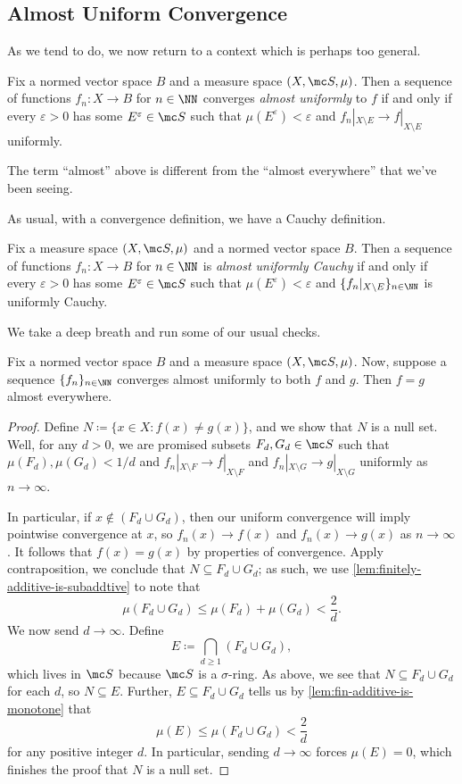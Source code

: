 \documentclass[../notes.tex]{subfiles}
\begin{document}
\subsection{Almost Uniform Convergence}
As we tend to do, we now return to a context which is perhaps too general.
\begin{definition}
	Fix a normed vector space $B$ and a measure space $(X,\mc S,\mu)$. Then a sequence of functions $f_n\colon X\to B$ for $n\in\NN$ converges \textit{almost uniformly} to $f$ if and only if every $\varepsilon>0$ has some $E^\varepsilon\in\mc S$ such that $\mu(E^\varepsilon)<\varepsilon$ and $f_n|_{X\setminus E}\to f|_{X\setminus E}$ uniformly.
\end{definition}
\begin{remark}
	The term ``almost'' above is different from the ``almost everywhere'' that we've been seeing.
\end{remark}
As usual, with a convergence definition, we have a Cauchy definition.
\begin{definition}
	Fix a measure space $(X,\mc S,\mu)$ and a normed vector space $B$. Then a sequence of functions $f_n\colon X\to B$ for $n\in\NN$ is \textit{almost uniformly Cauchy} if and only if every $\varepsilon>0$ has some $E^\varepsilon\in\mc S$ such that $\mu(E^\varepsilon)<\varepsilon$ and $\{f_n|_{X\setminus E}\}_{n\in\NN}$ is uniformly Cauchy.
\end{definition}
We take a deep breath and run some of our usual checks.
\begin{lemma}
	Fix a normed vector space $B$ and a measure space $(X,\mc S,\mu)$. Now, suppose a sequence $\{f_n\}_{n\in\NN}$ converges almost uniformly to both $f$ and $g$. Then $f=g$ almost everywhere.
\end{lemma}
\begin{proof}
	Define $N\coloneqq\{x\in X:f(x)\ne g(x)\}$, and we show that $N$ is a null set. Well, for any $d>0$, we are promised subsets $F_d,G_d\in\mc S$ such that $\mu(F_d),\mu(G_d)<1/d$ and $f_n|_{X\setminus F}\to f|_{X\setminus F}$ and $f_n|_{X\setminus G}\to g|_{X\setminus G}$ uniformly as $n\to\infty$.

	In particular, if $x\notin(F_d\cup G_d)$, then our uniform convergence will imply pointwise convergence at $x$, so $f_n(x)\to f(x)$ and $f_n(x)\to g(x)$ as $n\to\infty$. It follows that $f(x)=g(x)$ by properties of convergence. Apply contraposition, we conclude that $N\subseteq F_d\cup G_d$; as such, we use \autoref{lem:finitely-additive-is-subaddtive} to note that
	\[\mu(F_d\cup G_d)\le\mu(F_d)+\mu(G_d)<\frac2d.\]
	We now send $d\to\infty$. Define
	\[E\coloneqq\bigcap_{d\ge1}(F_d\cup G_d),\]
	which lives in $\mc S$ because $\mc S$ is a $\sigma$-ring. As above, we see that $N\subseteq F_d\cup G_d$ for each $d$, so $N\subseteq E$. Further, $E\subseteq F_d\cup G_d$ tells us by \autoref{lem:fin-additive-is-monotone} that
	\[\mu(E)\le\mu(F_d\cup G_d)<\frac2d\]
	for any positive integer $d$. In particular, sending $d\to\infty$ forces $\mu(E)=0$, which finishes the proof that $N$ is a null set.
\end{proof}
\end{document}
